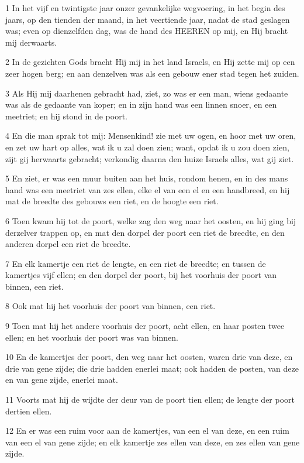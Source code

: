 \par 1 In het vijf en twintigste jaar onzer gevankelijke wegvoering, in het begin des jaars, op den tienden der maand, in het veertiende jaar, nadat de stad geslagen was; even op dienzelfden dag, was de hand des HEEREN op mij, en Hij bracht mij derwaarts.
\par 2 In de gezichten Gods bracht Hij mij in het land Israels, en Hij zette mij op een zeer hogen berg; en aan denzelven was als een gebouw ener stad tegen het zuiden.
\par 3 Als Hij mij daarhenen gebracht had, ziet, zo was er een man, wiens gedaante was als de gedaante van koper; en in zijn hand was een linnen snoer, en een meetriet; en hij stond in de poort.
\par 4 En die man sprak tot mij: Mensenkind! zie met uw ogen, en hoor met uw oren, en zet uw hart op alles, wat ik u zal doen zien; want, opdat ik u zou doen zien, zijt gij herwaarts gebracht; verkondig daarna den huize Israels alles, wat gij ziet.
\par 5 En ziet, er was een muur buiten aan het huis, rondom henen, en in des mans hand was een meetriet van zes ellen, elke el van een el en een handbreed, en hij mat de breedte des gebouws een riet, en de hoogte een riet.
\par 6 Toen kwam hij tot de poort, welke zag den weg naar het oosten, en hij ging bij derzelver trappen op, en mat den dorpel der poort een riet de breedte, en den anderen dorpel een riet de breedte.
\par 7 En elk kamertje een riet de lengte, en een riet de breedte; en tussen de kamertjes vijf ellen; en den dorpel der poort, bij het voorhuis der poort van binnen, een riet.
\par 8 Ook mat hij het voorhuis der poort van binnen, een riet.
\par 9 Toen mat hij het andere voorhuis der poort, acht ellen, en haar posten twee ellen; en het voorhuis der poort was van binnen.
\par 10 En de kamertjes der poort, den weg naar het oosten, waren drie van deze, en drie van gene zijde; die drie hadden enerlei maat; ook hadden de posten, van deze en van gene zijde, enerlei maat.
\par 11 Voorts mat hij de wijdte der deur van de poort tien ellen; de lengte der poort dertien ellen.
\par 12 En er was een ruim voor aan de kamertjes, van een el van deze, en een ruim van een el van gene zijde; en elk kamertje zes ellen van deze, en zes ellen van gene zijde.
